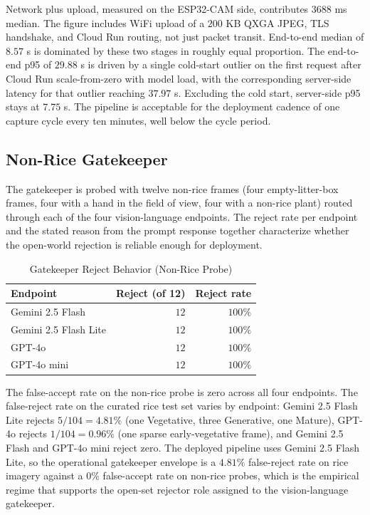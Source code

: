 Network plus upload, measured on the ESP32-CAM side, contributes $3688$ ms median. The figure includes WiFi upload of a $200$ KB QXGA JPEG, TLS handshake, and Cloud Run routing, not just packet transit. End-to-end median of $8.57$ s is dominated by these two stages in roughly equal proportion. The end-to-end p95 of $29.88$ s is driven by a single cold-start outlier on the first request after Cloud Run scale-from-zero with model load, with the corresponding server-side latency for that outlier reaching $37.97$ s. Excluding the cold start, server-side p95 stays at $7.75$ s. The pipeline is acceptable for the deployment cadence of one capture cycle every ten minutes, well below the cycle period.

\subsection{Non-Rice Gatekeeper}

The gatekeeper is probed with twelve non-rice frames (four empty-litter-box frames, four with a hand in the field of view, four with a non-rice plant) routed through each of the four vision-language endpoints. The reject rate per endpoint and the stated reason from the prompt response together characterize whether the open-world rejection is reliable enough for deployment.

\begin{table}[H]
    \centering
    \caption{Gatekeeper Reject Behavior (Non-Rice Probe)}
    \label{tab:field-gatekeeper}
    \begin{tabular}{lrr}
        \hline
        Endpoint & Reject (of 12) & Reject rate \\
        \hline
        Gemini 2.5 Flash       & $12$ & $100\%$ \\
        Gemini 2.5 Flash Lite  & $12$ & $100\%$ \\
        GPT-4o                 & $12$ & $100\%$ \\
        GPT-4o mini            & $12$ & $100\%$ \\
        \hline
    \end{tabular}
\end{table}

The false-accept rate on the non-rice probe is zero across all four endpoints. The false-reject rate on the curated rice test set varies by endpoint: Gemini 2.5 Flash Lite rejects $5/104 = 4.81\%$ (one Vegetative, three Generative, one Mature), GPT-4o rejects $1/104 = 0.96\%$ (one sparse early-vegetative frame), and Gemini 2.5 Flash and GPT-4o mini reject zero. The deployed pipeline uses Gemini 2.5 Flash Lite, so the operational gatekeeper envelope is a $4.81\%$ false-reject rate on rice imagery against a $0\%$ false-accept rate on non-rice probes, which is the empirical regime that supports the open-set rejector role assigned to the vision-language gatekeeper.

